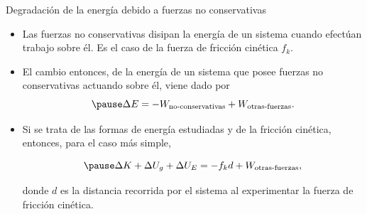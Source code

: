 
    \begin{frame}{Degradación de la energía debido a fuerzas no conservativas}
        
        \begin{itemize}
            \pause \item Las fuerzas no conservativas disipan la energía de un sistema cuando efectúan trabajo sobre él. Es el caso de la fuerza de fricción cinética $f_k$.
            
            \pause \item El cambio entonces, de la energía de un sistema que posee fuerzas no conservativas actuando sobre él, viene dado por
            \begin{equation}
            \pause     \Delta E = -W_{\text{no-conservativas}}+{W}_{\text{otras-fuerzas}}.
            \end{equation}
            
            \pause \item Si se trata de las formas de energía estudiadas y de la fricción cinética, entonces, para el caso más simple,
            
            \begin{equation}
            \pause     \Delta K +\Delta U_g + \Delta U_E = -f_k d+{W}_{\text{otras-fuerzas}},
            \end{equation}
            
            \pause donde $d$ es la distancia recorrida por el sistema al experimentar la fuerza de fricción cinética.
            
        \end{itemize}
        
    \end{frame}
    

